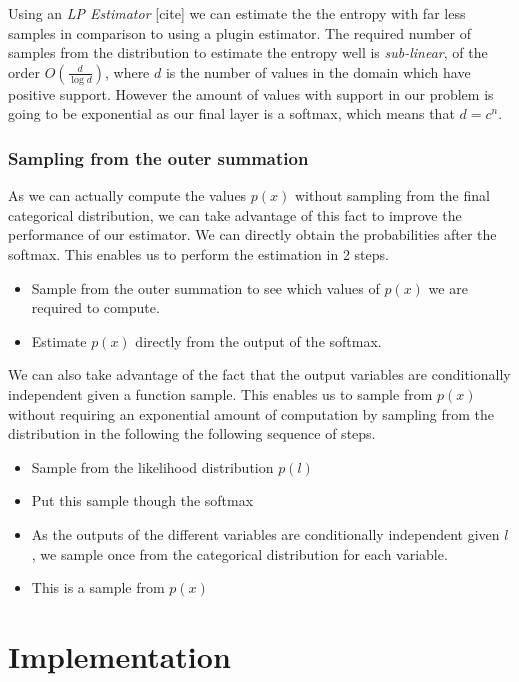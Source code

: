\documentclass[12pt, a4paper]{report}
\theoremstyle{definition}
\theoremstyle{definition}
\theoremstyle{definition}
\begin{document}
Using an \textit{LP Estimator} [cite] we can estimate the the entropy with far less samples in comparison to using a plugin estimator. The required number of samples from the distribution to estimate the entropy well is \textit{sub-linear}, of the order $O \left( \frac{d}{\log{d}}\right)$, where $d$ is the number of values in the domain which have positive support. However the amount of values with support in our problem is going to be exponential as our final layer is a softmax, which means that $d = c^n$.


\subsection{Sampling from the outer summation}

As we can actually compute the values $p(x)$ without sampling from the final categorical distribution, we can take advantage of this fact to improve the performance of our estimator. We can directly obtain the probabilities after the softmax. This enables us to perform the estimation in 2 steps.

\begin{itemize}
    \item Sample from the outer summation to see which values of $p(x)$ we are required to compute.
    \item Estimate $p(x)$ directly from the output of the softmax.
\end{itemize}

We can also take advantage of the fact that the output variables are conditionally independent given a function sample. This enables us to sample from $p(x)$ without requiring an exponential amount of computation by sampling from the distribution in the following the following sequence of steps.

\begin{itemize}
    \item Sample from the likelihood distribution $p(l)$
    \item Put this sample though the softmax
    \item As the outputs of the different variables are conditionally independent given $l$, we sample once from the categorical distribution for each variable.
    \item This is a sample from $p(x)$
\end{itemize}


\chapter{Implementation}
\label{sec:Implementaion}
\end{document}
